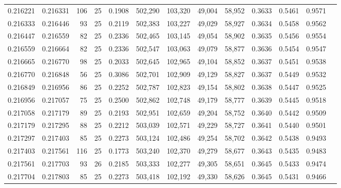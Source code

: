 \begin{tabular}{rrrrrrrrrrrrr}
0.216221 & 0.216331 &   106 &  25 &                                     0.1908 & 502,290 & 103,320 &  49,004 &  58,952 & 0.3633 & 0.5461 & 0.9571 \\
0.216333 & 0.216446 &    93 &  25 &                                     0.2119 & 502,383 & 103,227 &  49,029 &  58,927 & 0.3634 & 0.5458 & 0.9562 \\
0.216447 & 0.216559 &    82 &  25 &                                     0.2336 & 502,465 & 103,145 &  49,054 &  58,902 & 0.3635 & 0.5456 & 0.9554 \\
0.216559 & 0.216664 &    82 &  25 &                                     0.2336 & 502,547 & 103,063 &  49,079 &  58,877 & 0.3636 & 0.5454 & 0.9547 \\
0.216665 & 0.216770 &    98 &  25 &                                     0.2033 & 502,645 & 102,965 &  49,104 &  58,852 & 0.3637 & 0.5451 & 0.9538 \\
0.216770 & 0.216848 &    56 &  25 &                                     0.3086 & 502,701 & 102,909 &  49,129 &  58,827 & 0.3637 & 0.5449 & 0.9532 \\
0.216849 & 0.216956 &    86 &  25 &                                     0.2252 & 502,787 & 102,823 &  49,154 &  58,802 & 0.3638 & 0.5447 & 0.9525 \\
0.216956 & 0.217057 &    75 &  25 &                                     0.2500 & 502,862 & 102,748 &  49,179 &  58,777 & 0.3639 & 0.5445 & 0.9518 \\
0.217058 & 0.217179 &    89 &  25 &                                     0.2193 & 502,951 & 102,659 &  49,204 &  58,752 & 0.3640 & 0.5442 & 0.9509 \\
0.217179 & 0.217295 &    88 &  25 &                                     0.2212 & 503,039 & 102,571 &  49,229 &  58,727 & 0.3641 & 0.5440 & 0.9501 \\
0.217297 & 0.217403 &    85 &  25 &                                     0.2273 & 503,124 & 102,486 &  49,254 &  58,702 & 0.3642 & 0.5438 & 0.9493 \\
0.217403 & 0.217561 &   116 &  25 &                                     0.1773 & 503,240 & 102,370 &  49,279 &  58,677 & 0.3643 & 0.5435 & 0.9483 \\
0.217561 & 0.217703 &    93 &  26 &                                     0.2185 & 503,333 & 102,277 &  49,305 &  58,651 & 0.3645 & 0.5433 & 0.9474 \\
0.217704 & 0.217803 &    85 &  25 &                                     0.2273 & 503,418 & 102,192 &  49,330 &  58,626 & 0.3645 & 0.5431 & 0.9466 \\

\end{tabular}
